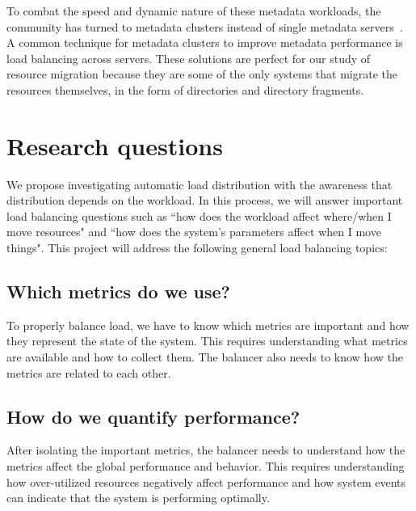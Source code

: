 
To combat the speed and dynamic nature of these metadata workloads, the community has turned to metadata clusters instead of single metadata servers~\cite{patil:fast2011-giga+,weil:osdi2006-ceph,weil:sc2004-dyn-metadata,sinnamohideen:atc2010-ursa,xing:sc2009-skyfs}. A common technique for metadata clusters to improve metadata performance is load balancing across servers. These solutions are perfect for our study of resource migration because they are some of the only systems that migrate the resources themselves, in the form of directories and directory fragments. 


\section{Research questions}
We propose investigating automatic load distribution with the awareness that distribution depends on the workload. In this process, we will answer important load balancing questions such as ``how does the workload affect where/when I move resources" and ``how does the system's parameters affect when I move things". This project will address the following general load balancing topics:

\subsection*{Which metrics do we use?}
To properly balance load, we have to know which metrics are important and how they represent the state of the system. This requires understanding what metrics are available and how to collect them. The balancer also needs to know how the metrics are related to each other.

\subsection*{How do we quantify performance?}
After isolating the important metrics, the balancer needs to understand how the metrics affect the global performance and behavior. This requires understanding how over-utilized resources negatively affect performance and how system events can indicate that the system is performing optimally.

